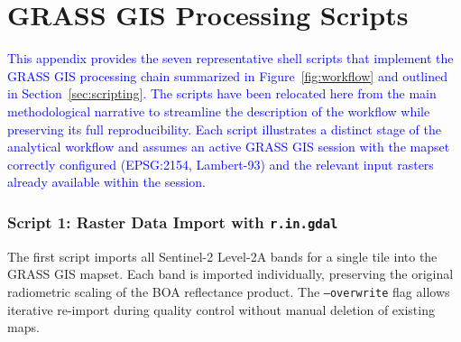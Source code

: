 \documentclass[coasts,article,submit,pdftex,moreauthors]{Definitions/mdpi}
\begin{document}





\appendix

\section{GRASS GIS Processing Scripts}
\label{app:scripts}

\textcolor{blue}{This appendix provides the seven representative shell scripts that implement the GRASS GIS processing chain summarized in Figure~\ref{fig:workflow} and outlined in Section~\ref{sec:scripting}. The scripts have been relocated here from the main methodological narrative to streamline the description of the workflow while preserving its full reproducibility. Each script illustrates a distinct stage of the analytical workflow and assumes an active GRASS GIS session with the mapset correctly configured (EPSG:2154, Lambert-93) and the relevant input rasters already available within the session.}

\subsubsection*{Script 1: Raster Data Import with \texttt{r.in.gdal}}

The first script imports all Sentinel-2 Level-2A bands for a single tile into the GRASS GIS mapset. Each band is imported individually, preserving the original radiometric scaling of the BOA reflectance product. The \texttt{--overwrite} flag allows iterative re-import during quality control without manual deletion of existing maps.
\end{document}
